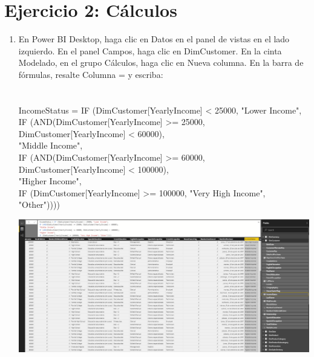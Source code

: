 \section{Ejercicio 2: Cálculos} 
		
\begin{enumerate}[1.]
	\item  En Power BI Desktop, haga clic en Datos en el panel de vistas en el lado izquierdo. En el panel Campos, haga clic en DimCustomer.  En la cinta Modelado, en el grupo Cálculos, haga clic en Nueva columna. En la barra de fórmulas, resalte Columna = y escriba:
	\\	
	\\
	\\IncomeStatus = IF (DimCustomer[YearlyIncome] < 25000, "Lower Income", \\
	  IF (AND(DimCustomer[YearlyIncome] >= 25000, DimCustomer[YearlyIncome] < 60000),\\
	  "Middle Income", \\
	   IF (AND(DimCustomer[YearlyIncome] >= 60000, DimCustomer[YearlyIncome] < 100000), \\
	"Higher Income", \\
	IF (DimCustomer[YearlyIncome] >= 100000, "Very High Income", "Other")))) \\

	\begin{center}
	\includegraphics[width=17cm]{./Imagenes/31} 
	\end{center}


\end{enumerate}
